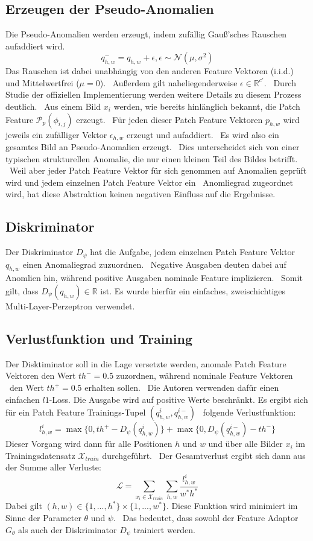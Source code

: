 \subsection{Erzeugen der Pseudo-Anomalien}\label{subsec:SimpleNet-PseudoAnomalien}
Die Pseudo-Anomalien werden erzeugt, indem zufällig Gauß'sches Rauschen aufaddiert wird. \
$$
q_{h,w}^{-} = q_{h,w} + \epsilon, \epsilon \sim \mathcal{N}(\mu,\sigma^{2})
$$
Das Rauschen ist dabei unabhängig von den anderen Feature Vektoren (i.i.d.) und Mittelwertfrei ($\mu = 0$). \
Außerdem gilt naheliegenderweise $\epsilon \in \mathbb{R}^{c'}$. \
Durch Studie der offiziellen Implementierung werden weitere Details zu diesem Prozess deutlich. \
Aus einem Bild $x_{i}$ werden, wie bereits hinlänglich bekannt, die Patch Feature $\mathcal{P}_{p}\left(\phi_{i,j}\right)$ erzeugt. \
Für jeden dieser Patch Feature Vektoren $p_{h,w}$ wird jeweils ein zufälliger Vektor $\epsilon_{h,w}$ erzeugt und aufaddiert. \
Es wird also ein gesamtes Bild an Pseudo-Anomalien erzeugt. \
Dies unterscheidet sich von einer typischen strukturellen Anomalie, die nur einen kleinen Teil des Bildes betrifft. \
Weil aber jeder Patch Feature Vektor für sich genommen auf Anomalien geprüft wird und jedem einzelnen Patch Feature Vektor ein \
Anomliegrad zugeordnet wird, hat diese Abstraktion keinen negativen Einfluss auf die Ergebnisse. \
\subsection{Diskriminator}\label{subsec:SimpleNet-Diskriminator}
Der Diskriminator $D_{\psi}$ hat die Aufgabe, jedem einzelnen Patch Feature Vektor $q_{h,w}$ einen Anomaliegrad zuzuordnen. \
Negative Ausgaben deuten dabei auf Anomlien hin, während positive Ausgaben nominale Feature implizieren. \
Somit gilt, dass $D_{\psi}(q_{h,w}) \in \mathbb{R}$ ist. Es wurde hierfür ein einfaches, zweischichtiges Multi-Layer-Perzeptron verwendet. \
\subsection{Verlustfunktion und Training}\label{subsubsec:SimpleNet-Diskriminator-Verlustfunktion}
Der Disktiminator soll in die Lage versetzte werden, anomale Patch Feature Vektoren den Wert $th^{-}=\num{0,5}$ zuzordnen, während nominale Feature Vektoren \
den Wert $th^{+}=\num{0,5}$ erhalten sollen. \
Die Autoren verwenden dafür einen einfachen $l1$-Loss. Die Ausgabe wird auf positive Werte beschränkt. Es ergibt sich für ein Patch Feature Trainings-Tupel $(q^{i}_{h,w},q^{i-}_{h,w})$ \
folgende Verlustfunktion: \\
$$
l_{h,w}^{i}= \max \{0,th^{+}-D_{\psi}(q^{i}_{h,w})\} + \max \{0,D_{\psi}(q^{i-}_{h,w})-th^{-}\}
$$
Dieser Vorgang wird dann für alle Positionen $h$ und $w$ und über alle Bilder $x_{i}$ im Trainingsdatensatz $\mathcal{X}_{train}$ durchgeführt. \
Der Gesamtverlust ergibt sich dann aus der Summe aller Verluste: \\
$$
\mathcal{L} = \sum_{x_{i}\in\mathcal{X}_{train}} \sum_{h,w} \frac{l_{h,w}^{i}}{w^{*}h^{*}}
$$
Dabei gilt $(h,w)\in\{1,...,h^{*}\}\times\{1,...,w^{*}\}$. Diese Funktion wird minimiert im Sinne der Parameter $\theta$ und $\psi$. \
Das bedeutet, dass sowohl der Feature Adaptor $G_{\theta}$ als auch der Diskriminator $D_{\psi}$ trainiert werden. 
